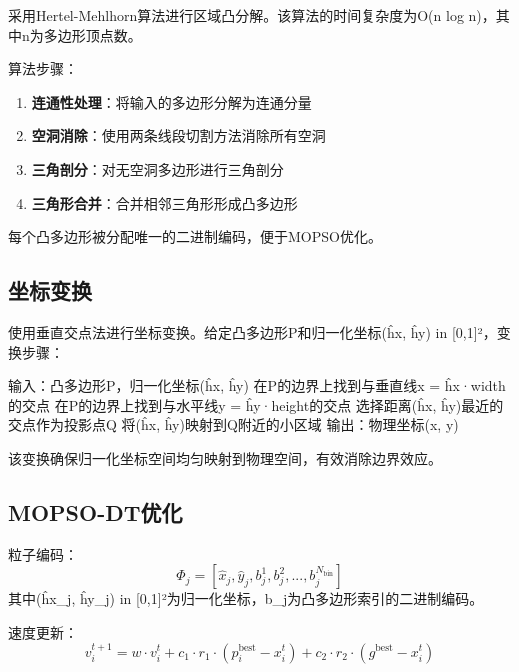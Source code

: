 采用Hertel-Mehlhorn算法进行区域凸分解。该算法的时间复杂度为O(n log n)，其中n为多边形顶点数。

算法步骤：
\begin{enumerate}
    \item \textbf{连通性处理}：将输入的多边形分解为连通分量
    \item \textbf{空洞消除}：使用两条线段切割方法消除所有空洞
    \item \textbf{三角剖分}：对无空洞多边形进行三角剖分
    \item \textbf{三角形合并}：合并相邻三角形形成凸多边形
\end{enumerate}

每个凸多边形被分配唯一的二进制编码，便于MOPSO优化。

\subsection{坐标变换}

使用垂直交点法进行坐标变换。给定凸多边形P和归一化坐标(ĥx, ĥy) in [0,1]²，变换步骤：

\begin{algorithm}
\caption{垂直交点坐标变换}
\begin{algorithmic}
\STATE 输入：凸多边形P，归一化坐标(ĥx, ĥy)
\STATE 在P的边界上找到与垂直线x = ĥx·width的交点
\STATE 在P的边界上找到与水平线y = ĥy·height的交点
\STATE 选择距离(ĥx, ĥy)最近的交点作为投影点Q
\STATE 将(ĥx, ĥy)映射到Q附近的小区域
\STATE 输出：物理坐标(x, y)
\end{algorithmic}
\end{algorithm}

该变换确保归一化坐标空间均匀映射到物理空间，有效消除边界效应。

\subsection{MOPSO-DT优化}

粒子编码：
\begin{equation}
    \Phi_j = [\hat{x}_j, \hat{y}_j, b_j^1, b_j^2, ..., b_j^{N_{\text{bin}}}]
\end{equation}
其中(ĥx\_j, ĥy\_j) in [0,1]²为归一化坐标，b\_j为凸多边形索引的二进制编码。

速度更新：
\begin{equation}
    v_i^{t+1} = w \cdot v_i^t + c_1 \cdot r_1 \cdot (p_i^{\text{best}} - x_i^t) + c_2 \cdot r_2 \cdot (g^{\text{best}} - x_i^t)
\end{equation}

